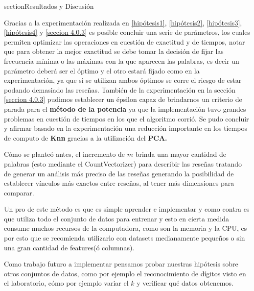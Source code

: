section{Resultados y Discusión}

Gracias a la experimentación realizada en \ref{hipótesis1}, \ref{hipótesis2}, \ref{hipótesis3}, \ref{hipótesis4} y \ref{seccion 4.0.3} es posible concluir una serie de parámetros, los cuales permiten optimizar las operaciones en cuestión de exactitud y de tiempos, notar que para obtener la mejor exactitud se debe tomar la decisión de fijar las frecuencia mínima o las máximas con la que aparecen las palabras, es decir un parámetro deberá ser el óptimo y el otro estará fijado como en la experimentación, ya que si se utilizan ambos óptimos se corre el riesgo de estar podando demasiado las reseñas. También de la experimentación en la sección \ref{seccion 4.0.3} pudimos establecer un épsilon capaz de brindarnos un criterio de parada para el \textbf{método de la potencia} ya que la implementación tuvo grandes problemas en cuestión de  tiempos en los que el algoritmo corrió. Se pudo concluir y afirmar basado en la experimentación una reducción importante en los tiempos de computo de \textbf{Knn} gracias a la utilización del \textbf{PCA.}  

Cómo se planteó antes, el incremento de $m$ brinda una mayor cantidad de palabras (esto mediante el CountVectorizer) para describir las reseñas tratando de generar un análisis más preciso de las reseñas generando la posibilidad de establecer vínculos más exactos entre reseñas, al tener más dimensiones para comparar.

Un pro de este método es que es simple aprender e implementar y como contra es que utiliza todo el conjunto de datos para entrenar y esto en cierta medida consume muchos recursos de la computadora, como son la memoria y la CPU, es por esto que se recomienda utilizarlo con datasets medianamente pequeños o sin una gran cantidad de features(ó columnas).

Como trabajo futuro a implementar pensamos probar nuestras hipótesis sobre otros conjuntos de datos, como por ejemplo el reconocimiento de dígitos visto en el laboratorio, cómo por ejemplo variar el $k$ y verificar qué datos obtenemos.

